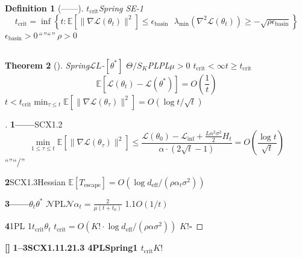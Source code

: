 \documentclass[11pt,a4paper]{article}
\newtheorem{theorem}{Theorem}[section]
\newtheorem{definition}[theorem]{Definition}
\theoremstyle{remark}
\newcommand{\E}{\mathbb{E}}
\newcommand{\rigorous}{\textnormal{\textbf{[]}}}
\begin{document}
\begin{definition}[——]
\label{def:critical_point}
$t_{\text{crit}}$Spring SE-1
\begin{equation}
    \boxed{
    t_{\text{crit}} = \inf\left\{t : \E[\|\nabla\mathcal{L}(\theta_t)\|^2] \leq \epsilon_{\text{basin}}
    \text{  } \lambda_{\min}(\nabla^2\mathcal{L}(\theta_t)) \geq -\sqrt{\rho\epsilon_{\text{basin}}}\right\}
    }
\end{equation}
$\epsilon_{\text{basin}} > 0$``''``''
$\rho > 0$
\end{definition}

\subsection{}

\begin{theorem}[]
\label{thm:critical_point}
Spring$\mathcal{L}$$L$-$[\theta^*]$
$\Theta/S_K$PLPL$\mu > 0$
$t_{\text{crit}} < \infty$$t \geq t_{\text{crit}}$
\begin{equation}
    \boxed{
    \E[\mathcal{L}(\theta_t) - \mathcal{L}(\theta^*)] = O\left(\frac{1}{t}\right)
    }
\end{equation}
$t < t_{\text{crit}}$$\min_{\tau \leq t} \E[\|\nabla\mathcal{L}(\theta_\tau)\|^2] = O(\log t / \sqrt{t})$
\end{theorem}

\begin{proof}[]
\textbf{1——}SCX1.2
\begin{equation}
    \min_{1 \leq \tau \leq t} \E[\|\nabla\mathcal{L}(\theta_\tau)\|^2]
    \leq \frac{\mathcal{L}(\theta_0) - \mathcal{L}_{\inf} + \frac{L\alpha^2\sigma^2}{2}H_t}{\alpha \cdot (2\sqrt{t} - 1)}
    = O\left(\frac{\log t}{\sqrt{t}}\right)
\end{equation}
``''``/''

\textbf{2}SCX1.3Hessian
$\E[T_{\text{escape}}] = O(\log d_{\text{eff}} / (\rho \alpha_t \sigma^2))$


\textbf{3——}$\theta_t$$\theta^*$
$\mathcal{N}$PL$\mathcal{N}$$\alpha_t = \frac{2}{\mu(t + t_0)}$
1.1$O(1/t)$

\textbf{4}1PL
1$t_{\text{crit}}$$\theta_t$
$t_{\text{crit}} = O(K! \cdot \log d_{\text{eff}} / (\rho \alpha \sigma^2))$
$K!$\hfill $\square$
\end{proof}

\rigorous{} \textbf{1--3SCX1.11.21.3
4PLSpring1
$t_{\text{crit}}$$K!$
}

\subsection{}
\end{document}

